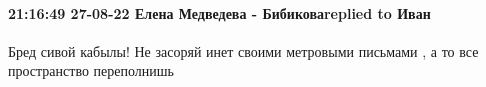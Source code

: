  
 
 
 
 

\paragraph{21:16:49 27-08-22 Елена Медведева - Бибиковаreplied to Иван}

Бред сивой кабылы! Не засоряй инет своими метровыми письмами , а то все
пространство переполнишь
